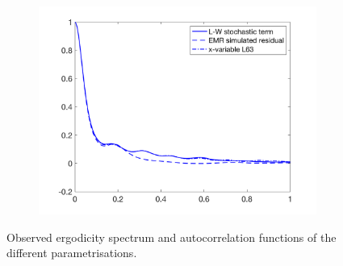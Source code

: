 \documentclass[12pt]{article}
\begin{document}
\begin{figure}[H]
\begin{subfigure}[b]{0.32\textwidth}
		\includegraphics[width=\textwidth]{plots/l84l63/acf_residuals.png}
	\end{subfigure}
	\caption{\label{ergodicity spectrum} Observed ergodicity spectrum and autocorrelation functions of the different parametrisations.}
\end{figure}
\end{document}
